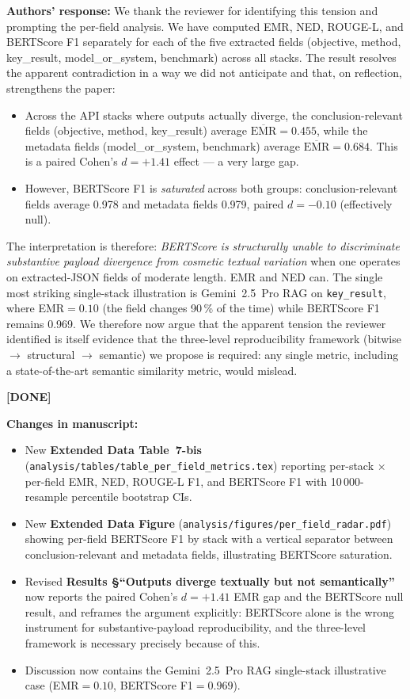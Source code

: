 \documentclass[11pt,a4paper]{article}
\newcommand{\response}[1]{\par\noindent\textbf{\color{revgreen}Authors' response:} #1\par}
\newcommand{\changes}[1]{\par\noindent\textbf{\color{revblue}Changes in manuscript:} #1\par}
\newcommand{\done}{\color{revgreen}\textbf{[DONE]}}
\begin{document}
\response{We thank the reviewer for identifying this tension and prompting the per-field analysis. We have computed EMR, NED, ROUGE-L, and BERTScore F1 separately for each of the five extracted fields (objective, method, key\_result, model\_or\_system, benchmark) across all stacks. The result resolves the apparent contradiction in a way we did not anticipate and that, on reflection, strengthens the paper:

\begin{itemize}[leftmargin=*]
  \item Across the API stacks where outputs actually diverge, the conclusion-relevant fields (objective, method, key\_result) average $\overline{\text{EMR}}=0.455$, while the metadata fields (model\_or\_system, benchmark) average $\overline{\text{EMR}}=0.684$. This is a paired Cohen's $d=+1.41$ effect --- a very large gap.
  \item However, BERTScore F1 is \emph{saturated} across both groups: conclusion-relevant fields average 0.978 and metadata fields 0.979, paired $d=-0.10$ (effectively null).
\end{itemize}

The interpretation is therefore: \emph{BERTScore is structurally unable to discriminate substantive payload divergence from cosmetic textual variation} when one operates on extracted-JSON fields of moderate length. EMR and NED can. The single most striking single-stack illustration is Gemini~2.5~Pro RAG on \texttt{key\_result}, where EMR$=0.10$ (the field changes 90\,\% of the time) while BERTScore F1 remains 0.969. We therefore now argue that the apparent tension the reviewer identified is itself evidence that the three-level reproducibility framework (bitwise $\to$ structural $\to$ semantic) we propose is required: any single metric, including a state-of-the-art semantic similarity metric, would mislead.} \done

\changes{
\begin{itemize}[leftmargin=*]
  \item New \textbf{Extended Data Table~7-bis} (\texttt{analysis/tables/table\_per\_field\_metrics.tex}) reporting per-stack $\times$ per-field EMR, NED, ROUGE-L F1, and BERTScore F1 with 10\,000-resample percentile bootstrap CIs.
  \item New \textbf{Extended Data Figure} (\texttt{analysis/figures/per\_field\_radar.pdf}) showing per-field BERTScore F1 by stack with a vertical separator between conclusion-relevant and metadata fields, illustrating BERTScore saturation.
  \item Revised \textbf{Results §``Outputs diverge textually but not semantically''} now reports the paired Cohen's $d=+1.41$ EMR gap and the BERTScore null result, and reframes the argument explicitly: BERTScore alone is the wrong instrument for substantive-payload reproducibility, and the three-level framework is necessary precisely because of this.
  \item Discussion now contains the Gemini~2.5~Pro RAG single-stack illustrative case (EMR$=0.10$, BERTScore F1$=0.969$).
\end{itemize}
}
\end{document}
